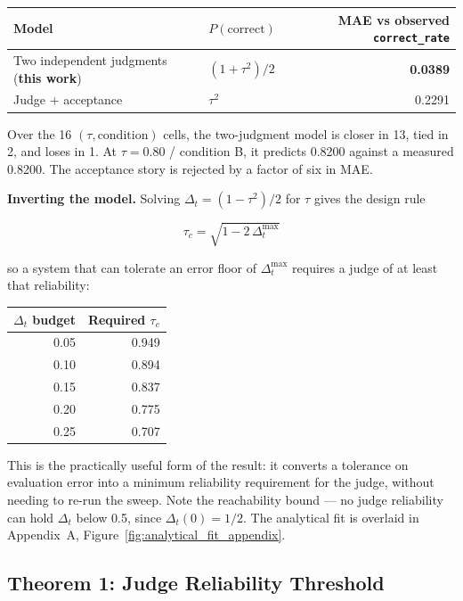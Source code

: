 \documentclass{article}
\begin{document}
\begin{center}
\small
\begin{tabular}{@{}llr@{}}
  \toprule
  Model & $P(\text{correct})$ & MAE vs observed \texttt{correct\_rate} \\
  \midrule
  Two independent judgments (\textbf{this work}) & $(1 + \tau^2)/2$ & \textbf{0.0389} \\
  Judge + acceptance & $\tau^2$ & 0.2291 \\
  \bottomrule
\end{tabular}
\end{center}

Over the 16 $(\tau, \text{condition})$ cells, the two-judgment model is closer in 13, tied in 2, and
loses in 1. At $\tau = 0.80$ / condition B, it predicts 0.8200 against a measured 0.8200. The
acceptance story is rejected by a factor of six in MAE.

\textbf{Inverting the model.} Solving $\Delta_t = (1 - \tau^2)/2$ for $\tau$ gives the design rule

\[
  \tau_c = \sqrt{1 - 2\,\Delta_t^{\max}}
\]

so a system that can tolerate an error floor of $\Delta_t^{\max}$ requires a judge of at least that
reliability:

\begin{center}
\small
\begin{tabular}{@{}rr@{}}
  \toprule
  $\Delta_t$ budget & Required $\tau_c$ \\
  \midrule
  0.05 & 0.949 \\
  0.10 & 0.894 \\
  0.15 & 0.837 \\
  0.20 & 0.775 \\
  0.25 & 0.707 \\
  \bottomrule
\end{tabular}
\end{center}

This is the practically useful form of the result: it converts a tolerance on evaluation error into
a minimum reliability requirement for the judge, without needing to re-run the sweep. Note the
reachability bound --- no judge reliability can hold $\Delta_t$ below 0.5, since $\Delta_t(0) = 1/2$.
The analytical fit is overlaid in Appendix~A, Figure~\ref{fig:analytical_fit_appendix}.

\subsection{Theorem 1: Judge Reliability Threshold}
\label{sec:theorem1}
\end{document}
